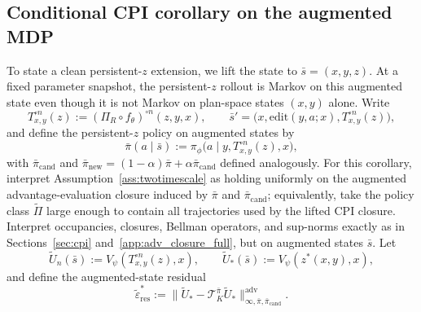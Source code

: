 \documentclass{article}
\theoremstyle{plain}
\theoremstyle{definition}
\theoremstyle{remark}
\begin{document}
\subsection{Conditional CPI corollary on the augmented MDP}
\label{sec:persistent_augmented_cpi}

To state a clean persistent-$z$ extension, we lift the state to $\bar s=(x,y,z)$.
At a fixed parameter snapshot, the persistent-$z$ rollout is Markov on this augmented state even though it is not Markov on plan-space states $(x,y)$ alone.
Write
\[
T_{x,y}^{\circ n}(z) := (\Pi_R \circ f_\theta)^{\circ n}(z,y,x),
\qquad
\bar s' = \bigl(x,\mathrm{edit}(y,a;x),T_{x,y}^{\circ n}(z)\bigr),
\]
and define the persistent-$z$ policy on augmented states by
\[
\bar \pi(a\mid \bar s)
:=
\pi_\phi\!\bigl(a\mid y,T_{x,y}^{\circ n}(z),x\bigr),
\]
with $\bar\pi_{\mathrm{cand}}$ and $\bar\pi_{\mathrm{new}}=(1-\alpha)\bar\pi+\alpha\bar\pi_{\mathrm{cand}}$ defined analogously.
For this corollary, interpret Assumption~\ref{ass:twotimescale} as holding uniformly on the augmented advantage-evaluation closure induced by $\bar\pi$ and $\bar\pi_{\mathrm{cand}}$; equivalently, take the policy class $\tilde\Pi$ large enough to contain all trajectories used by the lifted CPI closure.
Interpret occupancies, closures, Bellman operators, and sup-norms exactly as in Sections~\ref{sec:cpi} and~\ref{app:adv_closure_full}, but on augmented states $\bar s$.
Let
\[
\widetilde U_n(\bar s) := V_\psi(T_{x,y}^{\circ n}(z),x),
\qquad
\widetilde U_*(\bar s) := V_\psi(z^*(x,y),x),
\]
and define the augmented-state residual
\[
\widetilde \varepsilon_{\mathrm{res}}^*
:=
\|\widetilde U_* - \mathcal{T}^{\bar \pi}_K \widetilde U_*\|_{\infty,\bar\pi,\bar\pi_{\mathrm{cand}}}^{\mathrm{adv}}.
\]
\end{document}

